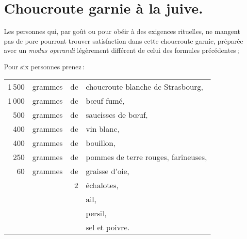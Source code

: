 \section*{\centering Choucroute garnie à la juive.}
{}

Les personnes qui, par goût ou pour obéir à des exigences rituelles, ne mangent
pas de porc pourront trouver satisfaction dans cette choucroute garnie,
préparée avec un \textit{modus operandi} légèrement différent de celui des
formules précédentes ;

\medskip

Pour six personnes prenez :

\footnotesize
\begin{longtable}{rrrp{16em}}
  1 500 & grammes & de & choucroute blanche de Strasbourg,                                                \\
  1 000 & grammes & de & bœuf fumé,                                                                       \\
    500 & grammes & de & saucisses de bœuf,                                                               \\
    400 & grammes & de & vin blanc,                                                                       \\
    400 & grammes & de & bouillon,                                                                        \\
    250 & grammes & de & pommes de terre rouges, farineuses,                                              \\
     60 & grammes & de & graisse d'oie,                                                                   \\
        &         &  2 & échalotes,                                                                       \\
        &         &    & ail,                                                                             \\
        &         &    & persil,                                                                          \\
        &         &    & sel et poivre.                                                                   \\
\end{longtable}
\normalsize

